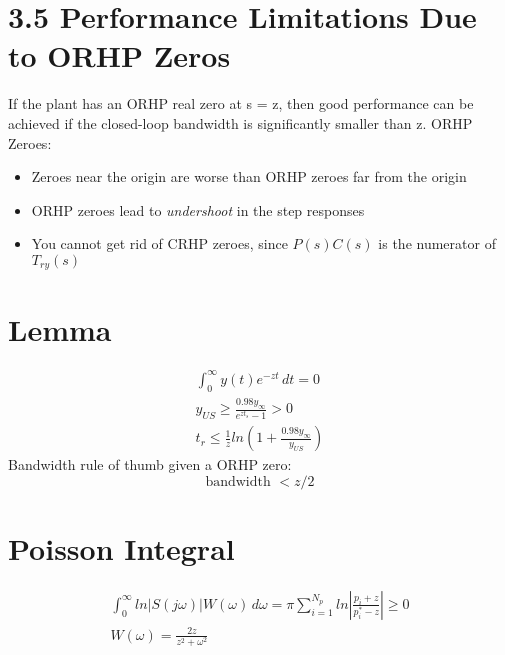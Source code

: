 \section*{3.5 Performance Limitations Due to ORHP Zeros}
If the plant has an ORHP real zero at s = z, then good performance can be achieved if the closed-loop bandwidth is significantly smaller than z. ORHP Zeroes:
\begin{itemize}
    \item Zeroes near the origin are worse than ORHP zeroes far from the origin
    \item ORHP zeroes lead to \textit{undershoot} in the step responses
    \item You cannot get rid of CRHP zeroes, since \(P(s)C(s)\) is the numerator of \(T_{ry}(s)\)
\end{itemize}
\section*{Lemma}
\begin{gather*}
    \int_{0}^{\infty} y(t)e^{-zt} \,dt = 0 \\
    y_{US} \geq \frac{0.98y_\infty}{e^{zt_s} - 1} > 0 \\
    t_r \leq \frac{1}{z} ln \left( 1 + \frac{0.98y_\infty}{y_{US}} \right)
\end{gather*}
Bandwidth rule of thumb given a ORHP zero:
\[ \text{bandwidth } < z/2 \]

\section*{Poisson Integral}
\begin{gather*}
    \int_{0}^{\infty} ln|S(j\omega)|W(\omega) \,d\omega = \pi\sum_{i = 1}^{N_p} ln\left| \frac{p_i + z}{p_i^* - z} \right| \geq 0 \\
    W(\omega) = \frac{2 z}{ z^2 + \omega ^ 2}
\end{gather*}